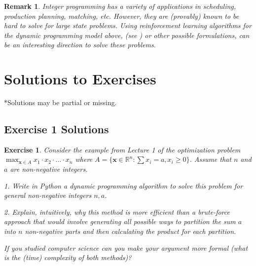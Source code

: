 \documentclass[letter,11pt]{article}
\newtheorem{exercise}{Exercise}[section]
\newtheorem{remark}{Remark}[section]
\begin{document}
\begin{remark}
    Integer programming has a variety of applications in scheduling, production planning,  matching, etc. However, they are (provably) known to be hard to solve for large state problems. Using reinforcement learning algorithms for the dynamic programming model above, (see \cite{tang2020reinforcement}) or other possible formulations,   can be an interesting direction to solve these problems. 
\end{remark}







\section{Solutions to Exercises}

*Solutions may be partial or missing. 


\subsection{Exercise 1 Solutions}
\begin{exercise}
    Consider the example from Lecture 1 of the optimization problem $\max _{ \boldsymbol{x} \in A  } x_{1} \cdot x_{2} \cdot \ldots \cdot x_{n}$
where $A = \{ \boldsymbol{x} \in \mathbb{R}^{n} : \sum x_{i} = a, x_{i} \geq 0 \}$. Assume that $n$ and $a$ are non-negative integers. 

1. Write in Python a dynamic programming algorithm to solve this problem for general non-negative integers $n,a$.

2.  Explain, intuitively, why this method is more efficient than a brute-force approach that would involve generating all possible ways to partition the sum 
$a$ into $n$
non-negative parts and then calculating the product for each partition. 

If you studied computer science can you make your argument more formal (what is the (time) complexity of both methods)?
\end{exercise}
\end{document}
